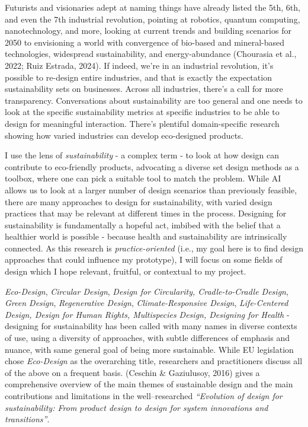 \documentclass[
  12pt,
  letterpaper,
  DIV=11,
  numbers=noendperiod]{scrartcl}
\begin{document}
Futurists and visionaries adept at naming things have already listed the
5th, 6th, and even the 7th industrial revolution, pointing at robotics,
quantum computing, nanotechnology, and more, looking at current trends
and building scenarios for 2050 to envisioning a world with convergence
of bio-based and mineral-based technologies, widespread sustainability,
and energy-abundance (Chourasia et al., 2022; Ruiz Estrada, 2024). If
indeed, we're in an industrial revolution, it's possible to re-design
entire industries, and that is exactly the expectation sustainability
sets on businesses. Across all industries, there's a call for more
transparency. Conversations about sustainability are too general and one
needs to look at the specific sustainability metrics at specific
industries to be able to design for meaningful interaction. There's
plentiful domain-specific research showing how varied industries can
develop eco-designed products.

I use the lens of \emph{sustainability} - a complex term - to look at
how design can contribute to eco-friendly products, advocating a diverse
set design methods as a toolbox, where one can pick a suitable tool to
match the problem. While AI allows us to look at a larger number of
design scenarios than previously feasible, there are many approaches to
design for sustainability, with varied design practices that may be
relevant at different times in the process. Designing for sustainability
is fundamentally a hopeful act, imbibed with the belief that a healthier
world is possible - because health and sustainability are intrinsically
connected. As this research is \emph{practice-oriented} (i.e., my goal
here is to find design approaches that could influence my prototype), I
will focus on some fields of design which I hope relevant, fruitful, or
contextual to my project.

\emph{Eco-Design}, \emph{Circular Design}, \emph{Design for Circularity,
Cradle-to-Cradle Design}, \emph{Green Design}, \emph{Regenerative
Design}, \emph{Climate-Responsive Design}, \emph{Life-Centered Design,
Design for Human Rights, Multispecies Design, Designing for Health} -
designing for sustainability has been called with many names in diverse
contexts of use, using a diversity of approaches, with subtle
differences of emphasis and nuance, with same general goal of being more
sustainable. While EU legislation chose \emph{Eco-Design} as the
overarching title, researchers and practitioners discuss all of the
above on a frequent basis. (Ceschin \& Gaziulusoy, 2016) gives a
comprehensive overview of the main themes of sustainable design and the
main contributions and limitations in the well--researched
\emph{``Evolution of design for sustainability: From product design to
design for system innovations and transitions''}.
\end{document}
